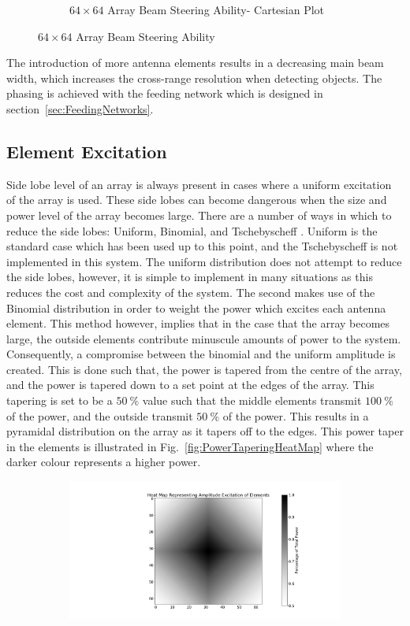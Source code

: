 \documentclass[11pt]{witseiepaper}
\begin{document}
\begin{bibunit}[witseie]
\begin{figure}[htb]
\begin{subfigure}{.5\textwidth}
            \caption{$64 \times 64$ Array Beam Steering Ability- Cartesian Plot}
                \label{fig:SteeringBig-Cartesian}
            \end{subfigure}
\caption{$64 \times 64$ Array Beam Steering Ability}
\label{fig:SteeringBig}
\end{figure}
The introduction of more antenna elements results in a decreasing main beam width, which increases the cross-range resolution when detecting objects\cite[p.~14,28,469]{radarHandbook}.
The phasing is achieved with the feeding network which is designed in section~\ref{sec:FeedingNetworks}.

\subsection{Element Excitation} \label{sec:ElementExcitation}
Side lobe level of an array is always present in cases where a uniform excitation of the array is used. These side lobes can become dangerous when the size and power level of the array becomes large.
There are a number of ways in which to reduce the side lobes: Uniform, Binomial, and Tschebyscheff \cite[p.~324-325]{Balanis}. Uniform is the standard case which has been used up to this point, and the Tschebyscheff is not implemented in this system. The uniform distribution does not attempt to reduce the side lobes, however, it is simple to implement in many situations as this reduces the cost and complexity of the system. The second makes use of the Binomial distribution in order to weight the power which excites each antenna element.
This method however, implies that in the case that the array becomes large, the outside elements contribute minuscule amounts of power to the system.
Consequently, a compromise between the binomial and the uniform amplitude is created.
This is done such that, the power is tapered from the centre of the array, and the power is tapered down to a set point at the edges of the array. This tapering is set to be a $50~\%$ value such that the middle elements transmit $100~\%$ of the power, and the outside transmit $50~\%$ of the power. This results in a pyramidal distribution on the array as it tapers off to the edges.
This power taper in the elements is illustrated in Fig.~\ref{fig:PowerTaperingHeatMap} where the darker colour represents a higher power.
\begin{figure}[htb]
    \centering
    \begin{subfigure}{.5\textwidth}
        \centering
            \includegraphics[width=0.9\linewidth]{PowerTapering.pdf}

\end{subfigure}
\end{figure}
\end{bibunit}
\end{document}
